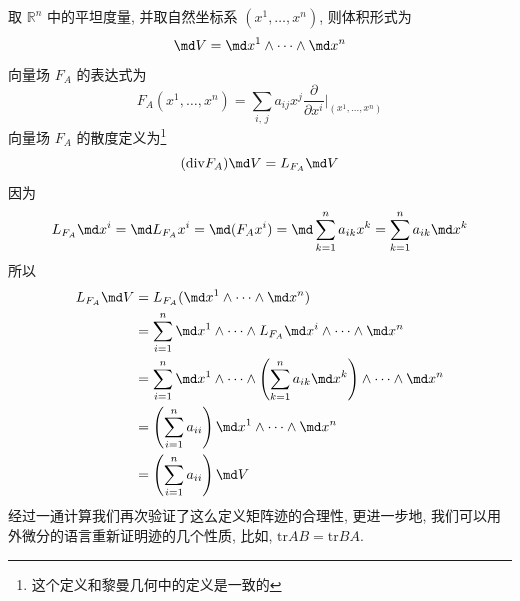     取 $\mathbb{R}^n$ 中的平坦度量, 并取自然坐标系 $(x^1,\dots,x^n)$, 则体积形式为
    \begin{equation*}
        \md V = \md x^1\wedge\cdots\wedge\md x^n
    \end{equation*}
    向量场 $F_A$ 的表达式为
    \begin{equation*}
        F_A(x^1,\dots,x^n) = \sum_{i,\,j}a_{ij}x^j\frac{\partial}{\partial x^i}\Bigg|_{(x^1,\dots,x^n)}
    \end{equation*}
    向量场 $F_A$ 的散度定义为\footnote{这个定义和黎曼几何中的定义是一致的}
    \begin{equation}\label{div}
        (\mathrm{div}F_A)\md V = L_{F_A}\md V
    \end{equation}
    因为
    \begin{equation*}
        L_{F_A}\md x^i = \md L_{F_A}x^i
        = \md (F_Ax^i)
        = \md \sum_{k=1}^{n}a_{ik}x^k
        = \sum_{k=1}^{n}a_{ik}\md x^k
    \end{equation*}
    所以
    \begin{align*}
        L_{F_A}\md V &= L_{F_A}(\md x^1\wedge\cdots\wedge\md x^n) \\
        &= \sum_{i=1}^{n}\md x^1\wedge\cdots\wedge L_{F_A}\md x^i \wedge\cdots\wedge\md x^n \\
        &= \sum_{i=1}^{n}\md x^1\wedge\cdots\wedge\left(\sum_{k=1}^{n}a_{ik}\md x^k\right)\wedge\cdots\wedge\md x^n \\
        &= \left(\sum_{i=1}^{n}a_{ii}\right)\md x^1\wedge\cdots\wedge\md x^n \\
        &= \left(\sum_{i=1}^{n}a_{ii}\right)\md V
    \end{align*}
    经过一通计算我们再次验证了这么定义矩阵迹的合理性, 更进一步地, 我们可以用外微分的语言重新证明迹的几个性质, 比如, $\mathrm{tr}AB = \mathrm{tr}BA$.
    

